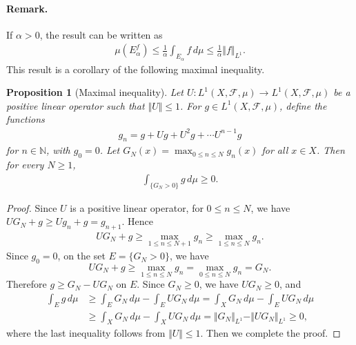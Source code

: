 \documentclass{article}
\numberwithin{equation}{section}
\newcommand{\bbN}{\mathbb{N}}
\newcommand{\scr}{\mathscr}
\theoremstyle{plain}
\newtheorem{proposition}[theorem]{Proposition}
\theoremstyle{definition}
\begin{document}
\paragraph{Remark.} If $\alpha>0$, the result can be written as
\begin{align}
	\mu(E_\alpha^f)\leq\frac{1}{\alpha}\int_{E_\alpha} f\,d\mu\leq\frac{1}{\alpha}\Vert f\Vert_{L^1}.\label{maxergineq}
\end{align}
This result is a corollary of the following maximal inequality.
\begin{proposition}[Maximal inequality]\label{maxerglemma}
Let $U:L^1(X,\scr{F},\mu)\to L^1(X,\scr{F},\mu)$ be a positive linear operator such that $\Vert U\Vert\leq 1$. For $g\in L^1(X,\scr{F},\mu)$, define the functions
\begin{align*}
	g_n=g+Ug+U^2g+\cdots U^{n-1}g
\end{align*}
for $n\in\bbN$, with $g_0=0$. Let $G_N(x)=\max_{0\leq n\leq N} g_n(x)$ for all $x\in X$. Then for every $N\geq 1$,
\begin{align*}
	\int_{\{G_N>0\}}g\,d\mu\geq 0.
\end{align*}
\end{proposition}
\begin{proof}
Since $U$ is a positive linear operator, for $0\leq n\leq N$, we have $UG_N+g\geq Ug_n+g=g_{n+1}$. Hence
\begin{align*}
	UG_N+g\geq\max_{1\leq n\leq N+1}g_n\geq \max_{1\leq n\leq N}g_n.
\end{align*}
Since $g_0=0$, on the set $E=\{G_N>0\}$, we have $$UG_N+g\geq \max_{1\leq n\leq N}g_n=\max_{0\leq n\leq N}g_n=G_N.$$
Therefore $g\geq G_N-UG_N$ on $E$. Since $G_N\geq 0$, we have $UG_N\geq 0$, and
\begin{align*}
	\int_E g\,d\mu&\geq\int_E G_N\,d\mu-\int_E UG_N\,d\mu=\int_X G_N\,d\mu-\int_E UG_N\,d\mu\\
	&\geq\int_X G_N\,d\mu-\int_X UG_N\,d\mu=\Vert G_N\Vert_{L^1}-\Vert UG_N\Vert_{L^1}\geq 0,
\end{align*}
where the last inequality follows from $\Vert U\Vert\leq 1$. Then we complete the proof.
\end{proof}
\end{document}
